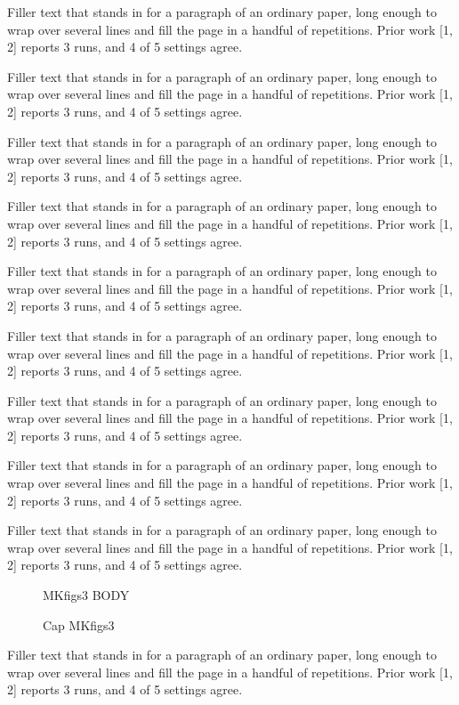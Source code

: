 \documentclass{article}
\begin{document}
Filler text that stands in for a paragraph of an ordinary paper, long enough to wrap over several lines and fill the page in a handful of repetitions. Prior work [1, 2] reports 3 runs, and 4 of 5 settings agree.\par
Filler text that stands in for a paragraph of an ordinary paper, long enough to wrap over several lines and fill the page in a handful of repetitions. Prior work [1, 2] reports 3 runs, and 4 of 5 settings agree.\par
Filler text that stands in for a paragraph of an ordinary paper, long enough to wrap over several lines and fill the page in a handful of repetitions. Prior work [1, 2] reports 3 runs, and 4 of 5 settings agree.\par
Filler text that stands in for a paragraph of an ordinary paper, long enough to wrap over several lines and fill the page in a handful of repetitions. Prior work [1, 2] reports 3 runs, and 4 of 5 settings agree.\par
Filler text that stands in for a paragraph of an ordinary paper, long enough to wrap over several lines and fill the page in a handful of repetitions. Prior work [1, 2] reports 3 runs, and 4 of 5 settings agree.\par
Filler text that stands in for a paragraph of an ordinary paper, long enough to wrap over several lines and fill the page in a handful of repetitions. Prior work [1, 2] reports 3 runs, and 4 of 5 settings agree.\par
Filler text that stands in for a paragraph of an ordinary paper, long enough to wrap over several lines and fill the page in a handful of repetitions. Prior work [1, 2] reports 3 runs, and 4 of 5 settings agree.\par
Filler text that stands in for a paragraph of an ordinary paper, long enough to wrap over several lines and fill the page in a handful of repetitions. Prior work [1, 2] reports 3 runs, and 4 of 5 settings agree.\par
Filler text that stands in for a paragraph of an ordinary paper, long enough to wrap over several lines and fill the page in a handful of repetitions. Prior work [1, 2] reports 3 runs, and 4 of 5 settings agree.\par
\begin{figure}[t]\centering MKfigs3 BODY\caption{Cap MKfigs3}\label{fig:s3}\end{figure}
Filler text that stands in for a paragraph of an ordinary paper, long enough to wrap over several lines and fill the page in a handful of repetitions. Prior work [1, 2] reports 3 runs, and 4 of 5 settings agree.\par
\end{document}
